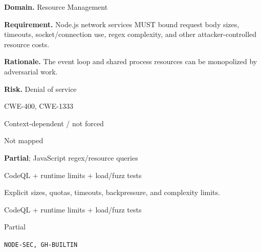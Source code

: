\documentclass[10pt,letterpaper]{article}
\newcommand{\prioritybadge}[2]{\tcbox[on line,boxrule=0pt,arc=1.2mm,boxsep=0.7mm,left=1mm,right=1mm,top=0.4mm,bottom=0.4mm,colback=#2!12,coltext=#2]{\scriptsize\bfseries #1}}
\begin{document}
\begin{rulebox}[title={\texttt{SCS-JS-RESOURCE-001} \hfill \prioritybadge{High Priority}{High}}]
\textbf{Domain.} Resource Management

\textbf{Requirement.} Node.js network services MUST bound request body sizes, timeouts, socket/connection use, regex complexity, and other attacker-controlled resource costs.

\textbf{Rationale.} The event loop and shared process resources can be monopolized by adversarial work.

\textbf{Risk.} Denial of service

\begin{description}[leftmargin=2.65cm,labelwidth=2.3cm,style=nextline,itemsep=1pt,topsep=3pt]
  \item[CWE] CWE-400, CWE-1333
  \item[OWASP] Context-dependent / not forced
  \item[CERT] Not mapped
  \item[CodeQL] \textbf{Partial}; JavaScript regex/resource queries
  \item[Enforcement] CodeQL + runtime limits + load/fuzz tests
  \item[Prevention] Explicit sizes, quotas, timeouts, backpressure, and complexity limits.
  \item[Verification] CodeQL + runtime limits + load/fuzz tests
  \item[Automation] Partial
  \item[Sources] \texttt{NODE-SEC, GH-BUILTIN}
\end{description}
\end{rulebox}
\end{document}

